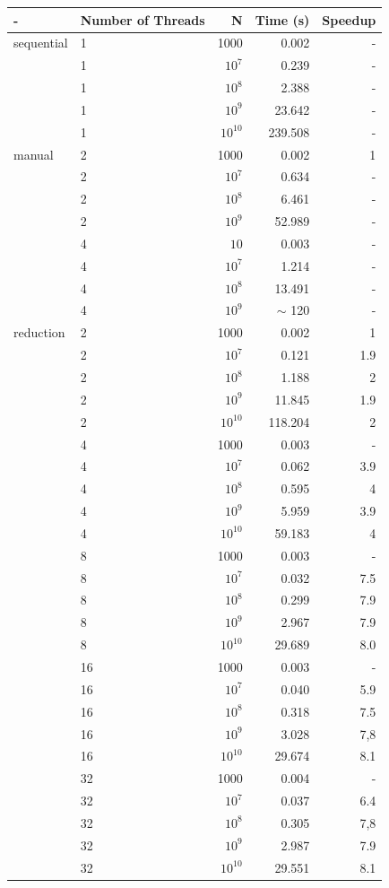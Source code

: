 \documentclass{report}
\begin{document}
	\begin{tabular}{|l|l|r|r|r|}
		\hline
		- & Number of Threads & N & Time (s) & Speedup \\
		\hline
		sequential & 1 & 1000 & 0.002 & - \\
		& 1 & $10^{7}$ & 0.239 & - \\
		& 1 & $10^{8}$ & 2.388 & - \\
		& 1 & $10^{9}$ & 23.642 & - \\
		& 1 & $10^{10}$ & 239.508 & - \\
		\hline
		manual & 2 & 1000 & 0.002 & 1 \\
		 & 2 & $10^{7}$ & 0.634 & - \\
		 & 2 & $10^{8}$ & 6.461 & - \\
		 & 2 & $10^{9}$ & 52.989 & - \\
		 & 4 & $10$ & 0.003 & - \\
		 & 4 & $10^{7}$ & 1.214 & - \\
		 & 4 & $10^{8}$ & 13.491 & - \\
		 & 4 & $10^{9}$ & $\sim$ 120 & - \\
		\hline
		reduction & 2 & 1000 & 0.002 & 1 \\
		 & 2 & $10^{7}$ & 0.121 & 1.9 \\
		 & 2 & $10^{8}$ & 1.188 & 2 \\
		 & 2 & $10^{9}$ & 11.845 & 1.9 \\
		 & 2 & $10^{10}$ & 118.204 & 2 \\
		 & 4 & 1000 & 0.003 & - \\
		 & 4 & $10^{7}$ & 0.062 & 3.9 \\
		 & 4 & $10^{8}$ & 0.595 & 4 \\
		 & 4 & $10^{9}$ & 5.959 & 3.9 \\
		 & 4 & $10^{10}$ & 59.183 & 4 \\
		 & 8 & 1000 & 0.003 & - \\
		 & 8 & $ 10^{7} $ & 0.032 & 7.5 \\
		 & 8 & $ 10^{8} $ & 0.299 & 7.9 \\
		 & 8 & $ 10^{9} $ & 2.967 & 7.9 \\
		 & 8 & $10^{10}$ & 29.689 & 8.0 \\
		 & 16 & 1000 & 0.003 & - \\
		 & 16 & $ 10^{7} $ & 0.040 & 5.9 \\
		 & 16 & $ 10^{8} $ & 0.318 & 7.5 \\
		 & 16 & $ 10^{9} $ & 3.028 & 7,8 \\
		 & 16 & $10^{10}$ & 29.674 & 8.1\\
		 & 32 & 1000 & 0.004 & - \\
		 & 32 & $ 10^{7} $ & 0.037 & 6.4 \\
		 & 32 & $ 10^{8} $ & 0.305 & 7,8 \\
		 & 32 & $ 10^{9} $ & 2.987 & 7.9 \\
		 & 32 & $10^{10}$ & 29.551 & 8.1 \\
		\hline
	\end{tabular}
\end{document}
